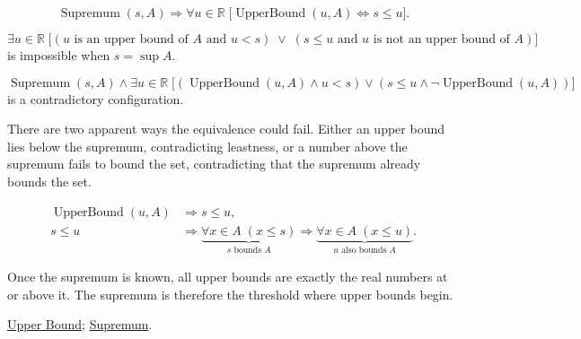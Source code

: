 \begin{remark*}
\[
\operatorname{Supremum}(s,A)
\Longrightarrow
\forall u\in\mathbb{R}\;
\bigl[\operatorname{UpperBound}(u,A)\Longleftrightarrow s\le u\bigr].
\]
\end{remark*}

\begin{remark*}
\[
\exists u\in\mathbb{R}\;
\bigl[
(u\text{ is an upper bound of }A\text{ and }u<s)
\;\lor\;
(s\le u\text{ and }u\text{ is not an upper bound of }A)
\bigr]
\]
is impossible when $s=\sup A$.
\end{remark*}

\begin{remark*}
\[
\operatorname{Supremum}(s,A)\land
\exists u\in\mathbb{R}\;
\bigl[
(\operatorname{UpperBound}(u,A)\land u<s)
\lor
(s\le u\land \neg\operatorname{UpperBound}(u,A))
\bigr]
\]
is a contradictory configuration.
\end{remark*}

\begin{remark*}
There are two apparent ways the equivalence could fail. Either an upper bound lies below the supremum, contradicting leastness, or a number above the supremum fails to bound the set, contradicting that the supremum already bounds the set.
\end{remark*}

\begin{remark*}
\[
\begin{aligned}
\operatorname{UpperBound}(u,A)&\Longrightarrow s\le u,\\
s\le u&\Longrightarrow
\underbrace{\forall x\in A\;(x\le s)}_{s\text{ bounds }A}
\Longrightarrow
\underbrace{\forall x\in A\;(x\le u)}_{u\text{ also bounds }A}.
\end{aligned}
\]
\end{remark*}

\begin{remark*}[Interpretation]
Once the supremum is known, all upper bounds are exactly the real numbers at or above it. The supremum is therefore the threshold where upper bounds begin.
\end{remark*}

\begin{dependencies}
\hyperref[def:upper-bound]{Upper Bound};
\hyperref[def:supremum]{Supremum}.
\end{dependencies}


